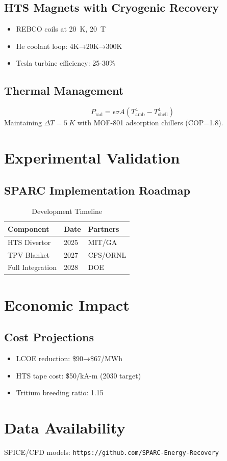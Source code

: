 \documentclass{article}
\begin{document}
\subsection{HTS Magnets with Cryogenic Recovery}
\begin{itemize}
    \item REBCO coils at \SI{20}{K}, \SI{20}{T}
    \item He coolant loop: 4K→20K→300K
    \item Tesla turbine efficiency: 25-30\%
\end{itemize}

\subsection{Thermal Management}
\begin{equation}
    P_{\text{rad}} = \epsilon \sigma A (T_{\text{amb}}^4 - T_{\text{shell}}^4)
\end{equation}
Maintaining \( \Delta T = \SI{5}{K} \) with MOF-801 adsorption chillers (COP=1.8).

\section{Experimental Validation}
\label{sec:validation}

\subsection{SPARC Implementation Roadmap}
\begin{table}[ht]
    \centering
    \caption{Development Timeline}
    \label{tab:timeline}
    \begin{tabular}{lll}
        \toprule
        Component & Date & Partners \\
        \midrule
        HTS Divertor & 2025 & MIT/GA \\
        TPV Blanket & 2027 & CFS/ORNL \\
        Full Integration & 2028 & DOE \\
        \bottomrule
    \end{tabular}
\end{table}

\section{Economic Impact}
\label{sec:economics}

\subsection{Cost Projections}
\begin{itemize}
    \item LCOE reduction: \$90→\$67/MWh
    \item HTS tape cost: \$50/kA-m (2030 target)
    \item Tritium breeding ratio: 1.15
\end{itemize}

\section*{Data Availability}
SPICE/CFD models: \texttt{https://github.com/SPARC-Energy-Recovery}



\end{document}
